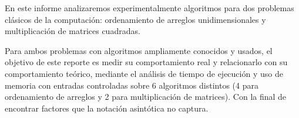 En este informe analizaremos experimentalmente algoritmos para dos problemas clásicos de la computación: ordenamiento de arreglos unidimensionales y multiplicación de matrices cuadradas.

Para ambos problemas con algoritmos ampliamente conocidos y usados, el objetivo de este reporte es medir su comportamiento real y relacionarlo con su comportamiento teórico, mediante el análisis de tiempo de ejecución y uso de memoria con entradas controladas sobre 6 algoritmos distintos (4 para ordenamiento de arreglos y 2 para multiplicación de matrices). Con la final de encontrar factores que la notación asintótica no captura.
